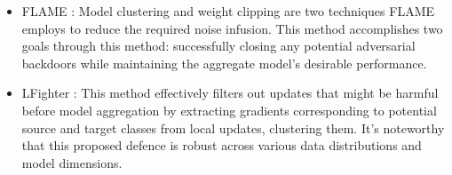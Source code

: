 \begin{itemize}
        \item FLAME \cite{FLAMEPaper}: Model clustering and weight clipping are two techniques FLAME employs to reduce the required noise infusion. This method accomplishes two goals through this method: successfully closing any potential adversarial backdoors while maintaining the aggregate model's desirable performance.
        \item LFighter \cite{ThesisNajeeb}: This method effectively filters out updates that might be harmful before model aggregation by extracting gradients corresponding to potential source and target classes from local updates, clustering them. It's noteworthy that this proposed defence is robust across various data distributions and model dimensions.
\end{itemize}






















